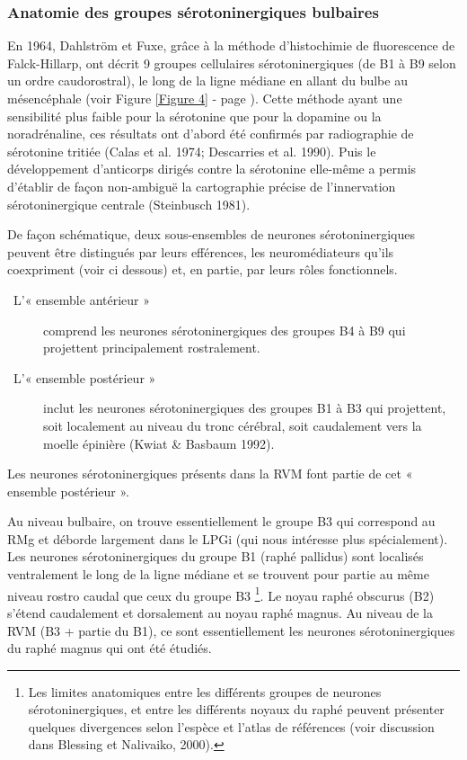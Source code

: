 \documentclass[a4paper,12pt,twoside]{report}
\begin{document}
\subsubsection{Anatomie des groupes sérotoninergiques bulbaires}
\label{Anatomie groupe 5-HT bulbaire}

En 1964, Dahlström et Fuxe, grâce à la méthode d’histochimie de fluorescence de Falck-Hillarp, ont décrit 9 groupes cellulaires sérotoninergiques (de B1 à B9 selon un ordre caudorostral), le long de la ligne médiane en allant du bulbe au mésencéphale (voir Figure \ref{Figure 4} - page \pageref{Figure 4}). Cette méthode ayant une sensibilité plus faible pour la sérotonine que pour la dopamine ou la noradrénaline, ces résultats ont d’abord été confirmés par radiographie de sérotonine tritiée (Calas et al. 1974; Descarries et al. 1990). Puis le développement d’anticorps dirigés contre la sérotonine elle-même a permis d’établir de façon non-ambiguë la cartographie précise de l’innervation sérotoninergique centrale (Steinbusch 1981).

De façon schématique, deux sous-ensembles de neurones sérotoninergiques peuvent être distingués par leurs efférences, les neuromédiateurs qu’ils coexpriment (voir ci dessous) et, en partie, par leurs rôles fonctionnels.

\begin{description}
\item [\textbullet~L’« ensemble antérieur »] comprend les neurones sérotoninergiques des groupes B4 à B9 qui projettent principalement rostralement. 

\item [\textbullet~L’« ensemble postérieur »] inclut les neurones sérotoninergiques des groupes B1 à B3 qui projettent, soit localement au niveau du tronc cérébral, soit caudalement vers la moelle épinière (Kwiat \& Basbaum 1992).
\end{description}

Les neurones sérotoninergiques présents dans la RVM font partie de cet « ensemble postérieur ». 

Au niveau bulbaire, on trouve essentiellement le groupe B3 qui correspond au RMg et déborde largement dans le LPGi (qui nous intéresse plus spécialement). Les neurones sérotoninergiques du groupe B1 (raphé pallidus) sont localisés ventralement le long de la ligne médiane et se trouvent pour partie au même niveau rostro caudal que ceux du groupe B3
\footnote{Les limites anatomiques entre les différents groupes de neurones sérotoninergiques, et entre les différents noyaux du raphé peuvent présenter quelques divergences selon l’espèce et l’atlas de références (voir discussion dans Blessing et Nalivaiko, 2000).}.
Le noyau raphé obscurus (B2) s'étend caudalement et dorsalement au noyau raphé magnus. Au niveau de la RVM (B3 + partie du B1), ce sont essentiellement les neurones sérotoninergiques du raphé magnus qui ont été étudiés.
\end{document}
